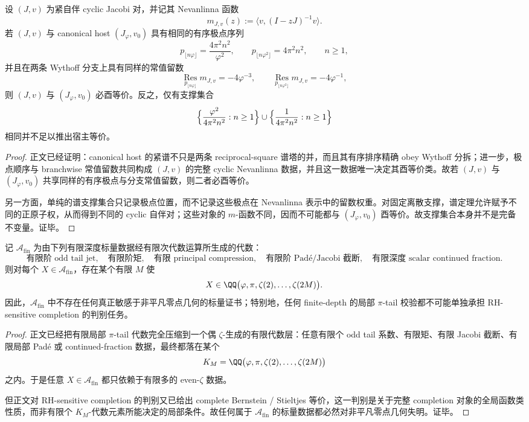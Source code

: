 \begin{theorem}\label{thm:conclusion-oddtail-ordered-nevanlinna-completeness}
设 \((J,v)\) 为紧自伴 cyclic Jacobi 对，并记其 Nevanlinna 函数
\[
m_{J,v}(z):=\langle v,(I-zJ)^{-1}v\rangle.
\]
若 \((J,v)\) 与 canonical host \((J_\varphi,v_0)\) 具有相同的有序极点序列
\[
p_{\lfloor n\varphi\rfloor}=\frac{4\pi^2n^2}{\varphi^2},
\qquad
p_{\lfloor n\varphi^2\rfloor}=4\pi^2n^2,
\qquad
n\ge 1,
\]
并且在两条 Wythoff 分支上具有同样的常值留数
\[
\operatorname*{Res}_{p_{\lfloor n\varphi\rfloor}}m_{J,v}=-4\varphi^{-3},
\qquad
\operatorname*{Res}_{p_{\lfloor n\varphi^2\rfloor}}m_{J,v}=-4\varphi^{-1},
\]
则 \((J,v)\) 与 \((J_\varphi,v_0)\) 必酉等价。反之，仅有支撑集合
\[
\Bigl\{\frac{\varphi^2}{4\pi^2n^2}:n\ge 1\Bigr\}
\cup
\Bigl\{\frac{1}{4\pi^2n^2}:n\ge 1\Bigr\}
\]
相同并不足以推出宿主等价。
\end{theorem}
\begin{proof}
正文已经证明：canonical host 的紧谱不只是两条 reciprocal-square 谱塔的并，而且其有序排序精确 obey Wythoff 分拆；进一步，极点顺序与 branchwise 常值留数共同构成 \((J,v)\) 的完整 cyclic Nevanlinna 数据，并且这一数据唯一决定其酉等价类。故若 \((J,v)\) 与 \((J_\varphi,v_0)\) 共享同样的有序极点与分支常值留数，则二者必酉等价。

另一方面，单纯的谱支撑集合只记录极点位置，而不记录这些极点在 Nevanlinna 表示中的留数权重。对固定离散支撑，谱定理允许赋予不同的正原子权，从而得到不同的 cyclic 自伴对；这些对象的 \(m\)-函数不同，因而不可能都与 \((J_\varphi,v_0)\) 酉等价。故支撑集合本身并不是完备不变量。证毕。
\end{proof}

\begin{theorem}[有限局部代数对零点几何绝对失明]\label{thm:conclusion-oddtail-finite-local-algebra-zero-geometry-blindness}
记 \(\mathcal A_{\mathrm{fin}}\) 为由下列有限深度标量数据经有限次代数运算所生成的代数：
\[
\text{有限阶 odd tail jet},
\quad
\text{有限阶矩},
\quad
\text{有限 principal compression},
\quad
\text{有限阶 Pad\'e/Jacobi 截断},
\quad
\text{有限深度 scalar continued fraction}.
\]
则对每个 \(X\in\mathcal A_{\mathrm{fin}}\)，存在某个有限 \(M\) 使
\[
X\in \QQ\bigl(\varphi,\pi,\zeta(2),\dots,\zeta(2M)\bigr).
\]
因此，\(\mathcal A_{\mathrm{fin}}\) 中不存在任何真正敏感于非平凡零点几何的标量证书；特别地，任何 finite-depth 的局部 \(\pi\)-tail 校验都不可能单独承担 RH-sensitive completion 的判别任务。
\end{theorem}
\begin{proof}
正文已经把有限局部 \(\pi\)-tail 代数完全压缩到一个偶 \(\zeta\)-生成的有限代数层：任意有限个 odd tail 系数、有限矩、有限 Jacobi 截断、有限局部 Pad\'e 或 continued-fraction 数据，最终都落在某个
\[
K_M=\QQ\bigl(\varphi,\pi,\zeta(2),\dots,\zeta(2M)\bigr)
\]
之内。于是任意 \(X\in\mathcal A_{\mathrm{fin}}\) 都只依赖于有限多的 even-\(\zeta\) 数据。

但正文对 RH-sensitive completion 的判别又已给出 complete Bernstein / Stieltjes 等价，这一判别是关于完整 completion 对象的全局函数类性质，而非有限个 \(K_M\)-代数元素所能决定的局部条件。故任何属于 \(\mathcal A_{\mathrm{fin}}\) 的标量数据都必然对非平凡零点几何失明。证毕。
\end{proof}

